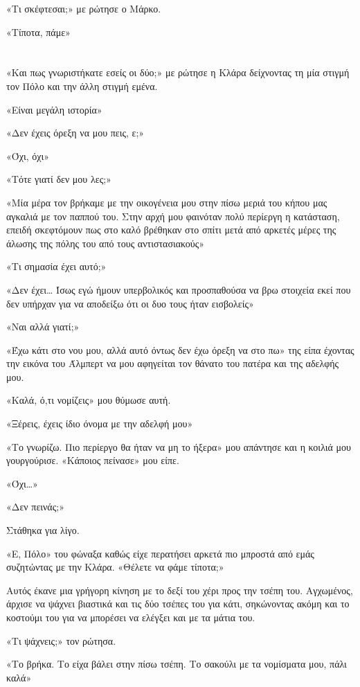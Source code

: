 \documentclass[12pt,twoside, openany]{book}
\begin{document}
«Τι σκέφτεσαι;» με ρώτησε ο Μάρκο.

«Τίποτα, πάμε»


\chapter{}

«Και πως γνωριστήκατε εσείς οι δύο;» με ρώτησε η Κλάρα δείχνοντας τη μία στιγμή τον Πόλο και την άλλη στιγμή εμένα.

«Είναι μεγάλη ιστορία»

«Δεν έχεις όρεξη να μου πεις, ε;»

«Όχι, όχι»

«Τότε γιατί δεν μου λες;»

«Μία μέρα τον βρήκαμε με την οικογένεια μου στην πίσω μεριά του κήπου μας αγκαλιά με τον παππού του. Στην αρχή μου φαινόταν πολύ περίεργη η κατάσταση, επειδή σκεφτόμουν πως στο καλό βρέθηκαν στο σπίτι μετά από αρκετές μέρες της άλωσης της πόλης του από τους αντιστασιακούς»

«Τι σημασία έχει αυτό;»

«Δεν έχει… Ίσως εγώ ήμουν υπερβολικός και προσπαθούσα να βρω στοιχεία εκεί που δεν υπήρχαν για να αποδείξω ότι οι δυο τους ήταν εισβολείς»

«Ναι αλλά γιατί;»

«Έχω κάτι στο νου μου, αλλά αυτό όντως δεν έχω όρεξη να στο πω» της είπα έχοντας την εικόνα του Άλμπερτ να μου αφηγείται τον θάνατο του πατέρα και της αδελφής μου.

«Καλά, ό,τι νομίζεις» μου θύμωσε αυτή.

«Ξέρεις, έχεις ίδιο όνομα με την αδελφή μου»

«Το γνωρίζω. Πιο περίεργο θα ήταν να μη το ήξερα» μου απάντησε και η κοιλιά μου γουργούρισε. «Κάποιος πείνασε» μου είπε.

«Όχι…»

«Δεν πεινάς;»

Στάθηκα για λίγο.

«Ε, Πόλο» του φώναξα καθώς είχε περατήσει αρκετά πιο μπροστά από εμάς συζητώντας με την Κλάρα. «Θέλετε να φάμε τίποτα;»

Αυτός έκανε μια γρήγορη κίνηση με το δεξί του χέρι προς την τσέπη του. Αγχωμένος, άρχισε να ψάχνει βιαστικά και τις δύο τσέπες του για κάτι, σηκώνοντας ακόμη και το κοστούμι του για να μπορέσει να ελέγξει και με τα μάτια του.

«Τι ψάχνεις;» τον ρώτησα.

«Το βρήκα. Το είχα βάλει στην πίσω τσέπη. Το σακούλι με τα νομίσματα μου, πάλι καλά»
\end{document}
